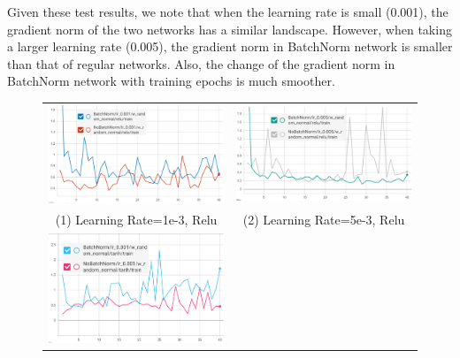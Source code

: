 \documentclass{article}
\begin{document}
Given these test results, we note that when the learning rate is small (0.001), the gradient norm of the two networks has a similar landscape. However, when taking a larger learning rate (0.005), the gradient norm in BatchNorm network is smaller than that of regular networks. Also, the change of the gradient norm in BatchNorm network with training epochs is much smoother.


\begin{figure}[h]
\begin{tabular}{cc}
  \includegraphics[scale=0.28]{pics/batchNorm/BatchNorm_relu_1.jpg} &
  \includegraphics[scale=0.31]{pics/batchNorm/BatchNorm_relu_5.jpg}
  \\
  (1) Learning Rate=1e-3, Relu & (2) Learning Rate=5e-3, Relu\\[6pt]
  \includegraphics[scale=0.3]{pics/batchNorm/BatchNorm_tanh_1.jpg} &

\end{tabular}
\end{figure}
\end{document}
